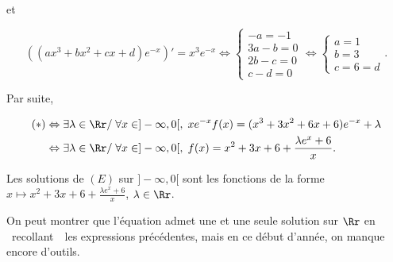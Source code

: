{{et

$$((ax^3+bx^2+cx+d)e^{-x})'=x^3e^{-x}\Leftrightarrow
\left\{
\begin{array}{l}
-a=-1\\
3a-b=0\\
2b-c=0\\
c-d=0
\end{array}
\right.
\Leftrightarrow
\left\{
\begin{array}{l}
a=1\\
b=3\\
c=6=d
\end{array}
\right..$$

Par suite,

\begin{align*}\ensuremath
(*)&\Leftrightarrow\exists\lambda\in\Rr/\;\forall x\in]-\infty,0[,\;xe^{-x}f(x)=(x^3+3x^2+6x+6)e^{-x}+\lambda\\
 &\Leftrightarrow\exists\lambda\in\Rr/\;\forall x\in]-\infty,0[,\;
f(x)=x^2+3x+6+\frac{\lambda e^x+6}{x}.
\end{align*}

Les solutions de $(E)$ sur $]-\infty,0[$ sont les fonctions de la forme $x\mapsto x^2+3x+6+\frac{\lambda e^x+6}{x}$,
$\lambda\in\Rr$.

On peut montrer que l'équation admet une et une seule solution sur $\Rr$ en \og~recollant~\fg~les expressions
précédentes, mais en ce début d'année, on manque encore d'outils.
}
}
